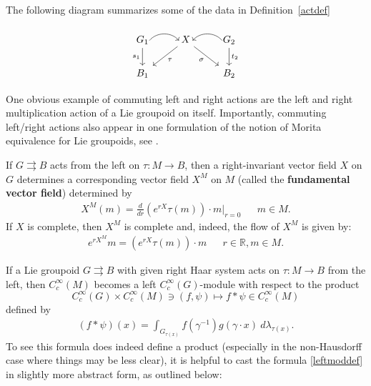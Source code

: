\documentclass[12pt]{article}
\theoremstyle{plain}
\theoremstyle{definition}
\newcommand{\R}{\mathbb{R}}
\numberwithin{equation}{section}
\begin{document}
The following diagram summarizes some of the  data in Definition~\ref{actdef}
\[ \begin{tikzcd}
G_1 \ar[d,"{s_1}"'] \ar[r,bend left=50,yshift=-2ex] & X \ar[ld,"{\tau}"] \ar[rd,"{\sigma }"']& G_2 \ar[l,bend right=50, yshift=-2ex] \ar[d,"{t_2}"]\\
B_1 & & B_2 
\end{tikzcd} \]

One obvious example of commuting left and right actions  are the left and right multiplication action of a Lie groupoid on itself. Importantly, commuting left/right actions also appear in one formulation of the notion of Morita equivalence for Lie groupoids, see \cite{Ping}.

If $G \rightrightarrows B$ acts from the left on $\tau:M \to B$, then a right-invariant vector field $X$ on $G$ determines a corresponding vector field $X^M$ on $M$ (called the \textbf{fundamental vector field}) determined by 
\begin{align*}
X^M(m) = \tfrac{d}{dr}  (e^{rX} \tau(m)) \cdot m \Big|_{r=0} && m \in M.
\end{align*}
If $X$ is complete, then $X^M$ is complete and, indeed, the flow of $X^M$ is given by:
\begin{align*}
e^{rX^M}m = (e^{rX} \tau(m)) \cdot m && r \in \R, m \in M.
\end{align*}


If a Lie groupoid $G\rightrightarrows B$ with given right Haar system acts on $\tau : M\to B$ from the left, then $C_c^\infty(M)$ becomes a left $C_c^\infty(G)$-module with respect to the product 
\[C_c^\infty(G) \times C_c^\infty(M) \ni (f,\psi) \mapsto f * \psi \in C_c^\infty(M)\] defined by 
\begin{align}\label{leftmoddef}
(f*\psi)(x) = \int_{G_{\tau(x)}} f( \gamma^{-1}) g (\gamma \cdot x) \ d\lambda_{\tau(x)}.
\end{align}
To see this formula does indeed define a product (especially in the non-Hausdorff case where things may be  less clear), it is helpful to cast the formula \eqref{leftmoddef} in slightly more abstract form, as outlined below:
\end{document}
